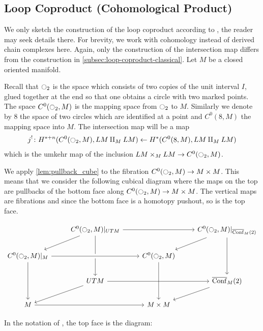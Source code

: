 \documentclass{scrartcl}
\theoremstyle{plain}
\theoremstyle{definition}
\newcommand{\from}{\leftarrow}
\renewcommand{\coprod}{\mathbin{\amalg}}
\DeclareMathOperator{\cConf}{\overline{Conf}}
\begin{document}
\subsection{Loop Coproduct (Cohomological Product)}\label{subsec:loop-coproduct}
We only sketch the construction of the loop coproduct according to \cite[Ch. 3.3]{naef2019string}, the reader may seek details there. For brevity, we work with cohomology instead of derived chain complexes here. Again, only the construction of the intersection map differs from the construction in \cref{subsec:loop-coproduct-classical}. Let $M$ be a closed oriented manifold. 

Recall that $\ocircle_2$ is the space which consists of two copies of the unit interval $I$, glued together at the end so that one obtains a circle with two marked points. The space $ C^0(\ocircle_2, M)$ is the mapping space from $\ocircle_2$ to $M$. Similarly we denote by $8$ the space of two circles which are identified at a point and $C^0(8, M)$ the mapping space into $M$. The intersection map will be a map
\begin{align*}
    j^!\colon H^{*+n}( C^0(\ocircle_2, M), LM\coprod_M LM) \from H^*( C^0(8, M), LM \coprod_M LM)
\end{align*}
which is the umkehr map of the inclusion $LM\times_M LM\to  C^0(\ocircle_2, M)$. 

We apply \ref{lem:pullback_cube} to the fibration $ C^0(\ocircle_2, M)\to M\times M$. This means that we consider the following cubical diagram where the maps on the top are pullbacks of the bottom face along $ C^0(\ocircle_2, M)\to M\times M$. The vertical maps are fibrations and since the bottom face is a homotopy pushout, so is the top face.

\begin{equation}
    \begin{tikzcd}
        &  C^0(\ocircle_2, M)|_{UTM}\ar{dd}\ar{dl} \ar{rr} &&  C^0(\ocircle_2, M)|_{\cConf_M(2)}\ar{dd}\ar{dl} \\
         C^0(\ocircle_2, M)|_M \ar[crossing over]{rr}\ar{dd} &&  C^0(\ocircle_2, M) \ar[crossing over]{dd}& \\
        & UTM \ar{dl}\ar{rr} && \cConf_M(2)\ar{dl} \\
        M \ar{rr} && M\times M &
    \end{tikzcd}
\end{equation}

In the notation of \cite{naef2019string}, the top face is the diagram:
\end{document}
